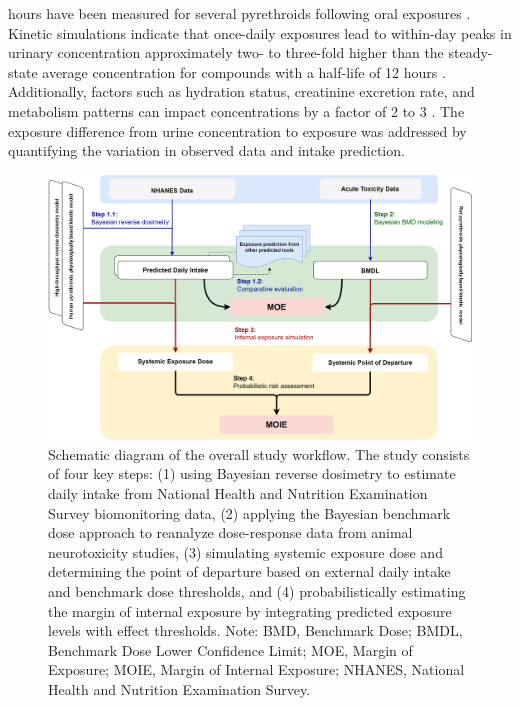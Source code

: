 \documentclass[toxics,article,submit,pdftex,moreauthors]{Definitions/mdpi}
\begin{document}
\begin{itemize}
  hours have been measured for several pyrethroids following oral
  exposures \citep{leng1997biological, woollen_metabolism_1992}. Kinetic
  simulations indicate that once-daily exposures lead to within-day
  peaks in urinary concentration approximately two- to three-fold higher
  than the steady-state average concentration for compounds with a
  half-life of 12 hours \citep{aylward_screening_level_2018}.
  Additionally, factors such as hydration status, creatinine excretion
  rate, and metabolism patterns can impact concentrations by a factor of
  2 to 3 \citep{scher2007agreement}. The exposure difference from urine
  concentration to exposure was addressed by quantifying the variation
  in observed data and intake prediction.
\end{itemize}

\begin{figure}[H]
\centering
\begin{adjustwidth}{-4cm}{}
\centering
\includegraphics[width=\linewidth]{figures/fig1}
\hfill
\end{adjustwidth}
\caption{Schematic diagram of the overall study workflow. The study consists of 
four key steps: (1) using Bayesian reverse dosimetry to estimate daily intake from 
National Health and Nutrition Examination Survey biomonitoring data, (2) applying 
the Bayesian benchmark dose approach to reanalyze dose-response data from animal 
neurotoxicity studies, (3) simulating systemic exposure dose and determining the 
point of departure based on external daily intake and benchmark dose thresholds, 
and (4) probabilistically estimating the margin of internal exposure by integrating 
predicted exposure levels with effect thresholds. Note: BMD, Benchmark Dose; BMDL, Benchmark Dose Lower Confidence Limit; MOE, Margin of Exposure; MOIE, Margin of Internal Exposure; NHANES, National Health and Nutrition Examination Survey.\label{fig1}}
\end{figure}
\end{document}
